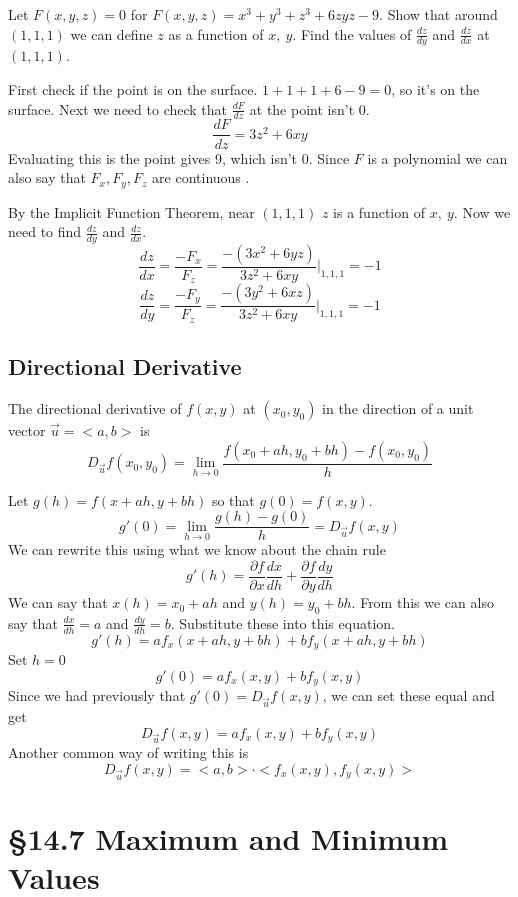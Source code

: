 \documentclass[12 pt]{article}
\begin{document}
        \begin{exmp*}
            Let $F(x,y,z)=0$ for $F(x,y,z)=x^3+y^3+z^3+6zyz-9$. Show that around $(1,1,1)$ we can define $z$ as a function of $x,\ y$. Find the values of $\frac{dz}{dy}$ and $\frac{dz}{dx}$ at $(1,1,1)$.

            First check if the point is on the surface. $1+1+1+6-9=0$, so it's on the surface. Next we need to check that $\frac{dF}{dz}$ at the point isn't 0.
            $$\frac{dF}{dz}=3z^2+6xy$$
            Evaluating this is the point gives 9, which isn't 0. Since $F$ is a polynomial we can also say that $F_x,F_y,F_z$ are continuous .

            By the Implicit Function Theorem, near $(1,1,1)$ $z$ is a function of $x,\ y$. Now we need to find $\frac{dz}{dy}$ and $\frac{dz}{dx}$.
            $$\frac{dz}{dx}=\frac{-F_x}{F_z}=\frac{-(3x^2+6yz)}{3z^2+6xy}\Big|_{1,1,1}=-1$$
            $$\frac{dz}{dy}=\frac{-F_y}{F_z}=\frac{-(3y^2+6xz)}{3z^2+6xy}\Big|_{1,1,1}=-1$$
        \end{exmp*}

        \subsection{Directional Derivative}

        \begin{def*}
            The directional derivative of $f(x,y)$ at $(x_0,y_0)$ in the direction of a unit vector $\vec{u}=<a,b>$ is
            $$D_{\vec{u}}f(x_0,y_0)=\lim_{h\rightarrow 0}\frac{f(x_0+ah,y_0+bh)-f(x_0,y_0)}{h}$$
        \end{def*}
        Let $g(h)=f(x+ah, y+bh)$ so that $g(0)=f(x,y)$.
        $$g'(0)=\lim_{h\rightarrow 0}\frac{g(h)-g(0)}{h}=D_{\vec{u}}f(x,y)$$
        We can rewrite this using what we know about the chain rule
        $$g'(h)=\frac{\partial f}{\partial x}\frac{dx}{dh}+\frac{\partial f}{\partial y}\frac{dy}{dh}$$
        We can say that $x(h)=x_0+ah$ and $y(h)=y_0+bh$. From this we can also say that $\frac{dx}{dh}=a$ and $\frac{dy}{dh}=b$. Substitute these into this equation.
        $$g'(h)=af_x(x+ah,y+bh)+bf_y(x+ah,y+bh)$$
        Set $h=0$
        $$g'(0)=af_x(x,y)+bf_y(x,y)$$
        Since we had previously that $g'(0)=D_{\vec{u}}f(x,y)$, we can set these equal and get
        $$D_{\vec{u}}f(x,y)=af_x(x,y)+bf_y(x,y)$$
        Another common way of writing this is
        $$D_{\vec{u}}f(x,y)=<a,b>\cdot<f_x(x,y),f_y(x,y)>$$


    \section{\S 14.7 Maximum and Minimum Values}
\end{document}
